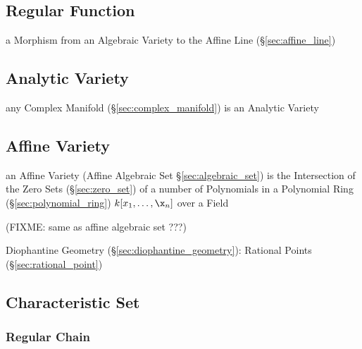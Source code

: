 \subsection{Regular Function}\label{sec:regular_function}

a Morphism from an Algebraic Variety to the Affine Line
(\S\ref{sec:affine_line})



\subsection{Analytic Variety}\label{sec:analytic_variety}

any Complex Manifold (\S\ref{sec:complex_manifold}) is an Analytic Variety



\subsection{Affine Variety}\label{sec:affine_variety}

an Affine Variety (Affine Algebraic Set \S\ref{sec:algebraic_set}) is the
Intersection of the Zero Sets (\S\ref{sec:zero_set}) of a number of Polynomials
in a Polynomial Ring (\S\ref{sec:polynomial_ring}) $k[x_1,\ldots,\x_n]$ over a
Field

(FIXME: same as affine algebraic set ???)

\fist Diophantine Geometry (\S\ref{sec:diophantine_geometry}): Rational Points
(\S\ref{sec:rational_point})



\subsection{Characteristic Set}\label{sec:characteristic_set}

\subsubsection{Regular Chain}\label{sec:regular_chain}



